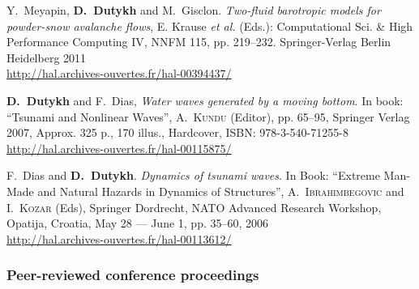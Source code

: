 \documentclass[final, a4paper, oneside, 12pt]{article}
\numberwithin{equation}{section}
\begin{document}
\begin{etaremune}


  \item Y.~Meyapin, \textbf{D.~Dutykh} and M.~Gisclon. \textit{Two-fluid barotropic models for powder-snow avalanche flows}, E. Krause \emph{et al.} (Eds.): Computational Sci. \& High Performance Computing IV, NNFM 115, pp. 219--232. Springer-Verlag Berlin Heidelberg 2011 \\ %
  \url{http://hal.archives-ouvertes.fr/hal-00394437/}
  

  
  \item \textbf{D.~Dutykh} and F.~Dias, \textit{Water waves generated by a moving bottom}. In book: ``Tsunami and Nonlinear Waves'', A.~\textsc{Kundu} (Editor), pp. 65--95, Springer Verlag 2007, Approx. 325 p., 170 illus., Hardcover, ISBN: 978-3-540-71255-8 \\ %
  \url{http://hal.archives-ouvertes.fr/hal-00115875/}
  

  
  \item F.~Dias and \textbf{D.~Dutykh}. \textit{Dynamics of tsunami waves}. In Book: ``Extreme Man-Made and Natural Hazards in Dynamics of Structures'', A.~\textsc{Ibrahimbegovic} and I.~\textsc{Kozar} (Eds), Springer Dordrecht, NATO Advanced Research Workshop, Opatija, Croatia, May 28 --- June 1, pp. 35--60, 2006 \\ %
  \url{http://hal.archives-ouvertes.fr/hal-00113612/}
  
\end{etaremune}

\subsubsection{Peer-reviewed conference proceedings}
\end{document}
